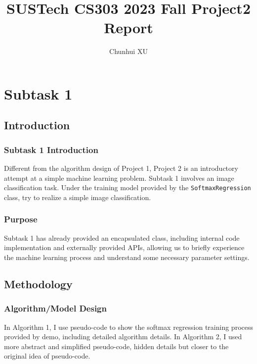 \documentclass{article}
\title{SUSTech CS303 2023 Fall Project2 Report}
\author{Chunhui XU}
\begin{document}
\maketitle

\section{Subtask 1}

\subsection{Introduction}

\subsubsection{Subtask 1 Introduction}
Different from the algorithm design of Project 1, Project 2 is an introductory attempt at a simple machine learning problem. Subtask 1 involves an image classification task. Under the training model provided by the \texttt{SoftmaxRegression} class, try to realize a simple image classification.

\subsubsection{Purpose}
Subtask 1 has already provided an encapsulated class, including internal code implementation and externally provided APIs, allowing us to briefly experience the machine learning process and understand some necessary parameter settings.



\subsection{Methodology}

\subsubsection{Algorithm/Model Design}
In Algorithm 1, I use pseudo-code to show the softmax regression training process provided by demo, including detailed algorithm details. In Algorithm 2, I used more abstract and simplified pseudo-code, hidden details but closer to the original idea of pseudo-code.
\end{document}
